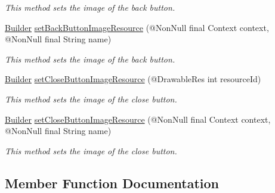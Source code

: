 \begin{DoxyCompactItemize}
\begin{DoxyCompactList}\small\item\em This method sets the image of the back button. \end{DoxyCompactList}\item 
\hyperlink{classcom_1_1toast_1_1android_1_1gamebase_1_1_gamebase_web_view_configuration_1_1_builder}{Builder} \hyperlink{classcom_1_1toast_1_1android_1_1gamebase_1_1_gamebase_web_view_configuration_1_1_builder_a1b1f92b0859afc2d7c1fb4b166f1f53b}{set\+Back\+Button\+Image\+Resource} (@Non\+Null final Context context, @Non\+Null final String name)
\begin{DoxyCompactList}\small\item\em This method sets the image of the back button. \end{DoxyCompactList}\item 
\hyperlink{classcom_1_1toast_1_1android_1_1gamebase_1_1_gamebase_web_view_configuration_1_1_builder}{Builder} \hyperlink{classcom_1_1toast_1_1android_1_1gamebase_1_1_gamebase_web_view_configuration_1_1_builder_a01ef1245b0fd70cc42aad5c681e668a5}{set\+Close\+Button\+Image\+Resource} (@Drawable\+Res int resource\+Id)
\begin{DoxyCompactList}\small\item\em This method sets the image of the close button. \end{DoxyCompactList}\item 
\hyperlink{classcom_1_1toast_1_1android_1_1gamebase_1_1_gamebase_web_view_configuration_1_1_builder}{Builder} \hyperlink{classcom_1_1toast_1_1android_1_1gamebase_1_1_gamebase_web_view_configuration_1_1_builder_a2d3eec6995ebe8ae5bbb8b4883f0b721}{set\+Close\+Button\+Image\+Resource} (@Non\+Null final Context context, @Non\+Null final String name)
\begin{DoxyCompactList}\small\item\em This method sets the image of the close button. \end{DoxyCompactList}\end{DoxyCompactItemize}


\subsection{Member Function Documentation}
\mbox{\label{classcom_1_1toast_1_1android_1_1gamebase_1_1_gamebase_web_view_configuration_1_1_builder_aa876865decc9e4d1f0faa73926a6442a}} 
